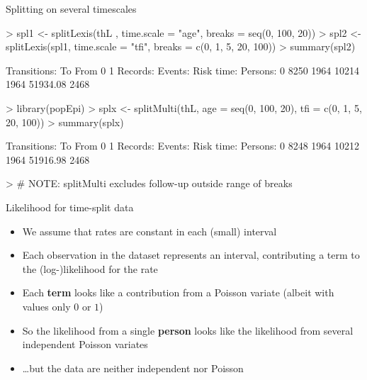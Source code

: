 \begin{frame}[fragile]{Splitting on several timescales}
\vspace*{-1em}
\begin{Schunk}
\begin{Sinput}
> spl1 <- splitLexis(thL , time.scale = "age", breaks = seq(0, 100, 20))
> spl2 <- splitLexis(spl1, time.scale = "tfi", breaks = c(0, 1, 5, 20, 100))
> summary(spl2)
\end{Sinput}
\begin{Soutput}
Transitions:
     To
From    0    1  Records:  Events: Risk time:  Persons:
   0 8250 1964     10214     1964   51934.08      2468
\end{Soutput}
\begin{Sinput}
> library(popEpi)
> splx <- splitMulti(thL, age = seq(0, 100, 20), tfi = c(0, 1, 5, 20, 100))
> summary(splx)
\end{Sinput}
\begin{Soutput}
Transitions:
     To
From    0    1  Records:  Events: Risk time:  Persons:
   0 8248 1964     10212     1964   51916.98      2468
\end{Soutput}
\begin{Sinput}
> # NOTE: splitMulti excludes follow-up outside range of breaks
\end{Sinput}
\end{Schunk}
\end{frame}

\begin{frame}[fragile]{Likelihood for time-split data}
  \begin{itemize}[<+->]
  \item We assume that rates are constant in each (small) interval
  \item Each observation in the dataset represents an interval,
    contributing a term to the (log-)likelihood for the rate
  \item Each \textbf{term} \alert<4->{looks like} a contribution from a Poisson variate
    (albeit with values only $0$ or $1$)
  \item So the likelihood from a single \textbf{person}
    \alert<4->{looks like} the likelihood from several independent
    Poisson variates
  \item \ldots but the data are neither independent nor Poisson
  \end{itemize}
\end{frame}

